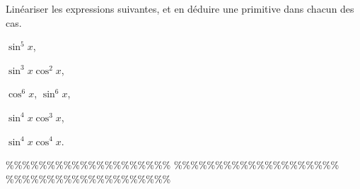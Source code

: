



\begin{exercice}  \;
Lin\'eariser les expressions suivantes, et en d\'eduire une primitive dans chacun des cas.
\begin{enumerate}
\begin{minipage}[t]{0.45\textwidth}
\item $\sin^5{x}$,
\item $\sin^3{x}\cos^2{x}$,
\item $\cos^6{x}$, $\sin^6{x}$,
\end{minipage}
\begin{minipage}[t]{0.45\textwidth}
\item $\sin^4{x}\cos^3{x}$,
\item $\sin^4{x}\cos^4{x}$.
\end{minipage}
\end{enumerate}
\end{exercice}


\%\%\%\%\%\%\%\%\%\%\%\%\%\%\%\%\%\%\%\%
\%\%\%\%\%\%\%\%\%\%\%\%\%\%\%\%\%\%\%\%
\%\%\%\%\%\%\%\%\%\%\%\%\%\%\%\%\%\%\%\%




